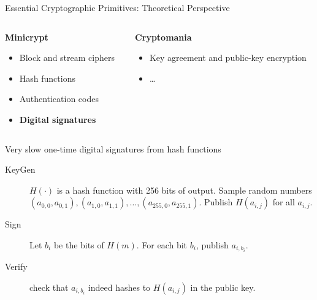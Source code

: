 \documentclass[xcolor=table,10pt,aspectratio=169]{beamer}
\begin{document}
\begin{frame}[label={sec:org93b4a64}]{Essential Cryptographic Primitives: Theoretical Perspective}
\begin{columns}[t]
\begin{column}{0.5\columnwidth}
\textbf{Minicrypt}

\small

\begin{itemize}
\item Block and stream ciphers
\item Hash functions
\item Authentication codes
\item \textbf{Digital signatures}
\end{itemize}
\end{column}

\begin{column}{0.5\columnwidth}
\textbf{Cryptomania}

\small

\begin{itemize}
\item Key agreement and public-key encryption
\item \ldots
\end{itemize}


\pause
\end{column}
\end{columns}

\begin{block}{Very slow one-time digital signatures from hash functions}
\begin{description}
\item[{KeyGen}] \(H(\cdot)\) is a hash function with 256 bits of output. Sample random numbers \((a_{0,0}, a_{0,1}), (a_{1,0}, a_{1,1}), \ldots, (a_{255,0}, a_{255,1})\). Publish \(H(a_{i,j})\) for all \(a_{i,j}\).
\item[{Sign}] Let \(b_i\) be the bits of \(H(m)\). For each bit \(b_i\), publish \(a_{i, b_i}\).
\item[{Verify}] check that \(a_{i, b_i}\) indeed hashes to \(H(a_{i,j})\) in the public key.
\end{description}
\end{block}
\end{frame}
\end{document}
